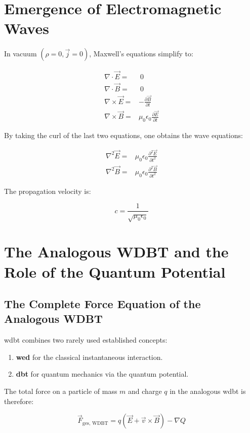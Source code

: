 \section{Emergence of Electromagnetic Waves}
In vacuum $(\rho = 0, \vec{j} = 0)$, Maxwell's equations simplify to:

\begin{align}
\nabla \cdot \vec{E} =&~0\\
\nabla \cdot \vec{B} =&~0\\
\nabla \times \vec{E} =& -\frac{\partial \vec{B}}{\partial t}\\
\nabla \times \vec{B} =& \mu_0 \epsilon_0 \frac{\partial \vec{E}}{\partial t}
\end{align}

By taking the curl of the last two equations, one obtains the wave equations:

\begin{align}
\nabla^2 \vec{E} =& \mu_0 \epsilon_0 \frac{\partial^2 \vec{E}}{\partial t^2}\\
\nabla^2 \vec{B} =& \mu_0 \epsilon_0 \frac{\partial^2 \vec{B}}{\partial t^2}
\end{align}

The propagation velocity is:

\begin{equation}
    c = \frac{1}{\sqrt{\mu_0 \epsilon_0}}
\end{equation}

\newpage
\section{The Analogous WDBT and the Role of the Quantum Potential}
\subsection{The Complete Force Equation of the Analogous WDBT}
\gls{wdbt} combines two rarely used established concepts:

\begin{enumerate}
    \item \textbf{\gls{wed}} for the classical instantaneous interaction.
    \item \textbf{\gls{dbt}} for quantum mechanics via the quantum potential.
\end{enumerate}

The total force on a particle of mass $m$ and charge $q$ in the analogous \gls{wdbt} is therefore:

\begin{equation}
    \vec{F}_{\text{ges, WDBT}} = q(\vec{E} + \vec{v} \times \vec{B}) - \nabla Q
\end{equation}

